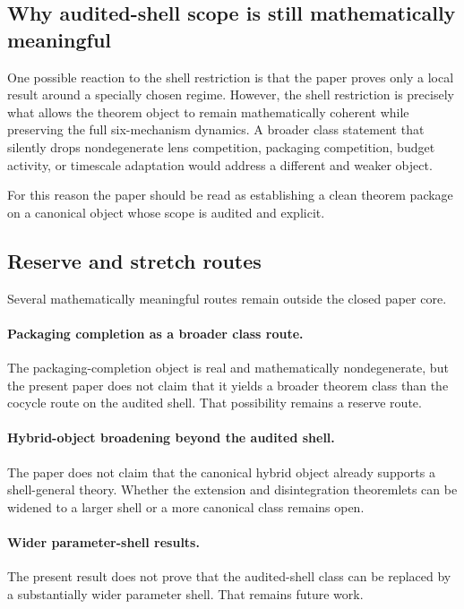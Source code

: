 \documentclass[11pt]{article}
\theoremstyle{definition}
\begin{document}
\subsection{Why audited-shell scope is still mathematically meaningful}

One possible reaction to the shell restriction is that the paper proves only a local result around a specially chosen regime. However, the shell restriction is precisely what allows the theorem object to remain mathematically coherent while preserving the full six-mechanism dynamics. A broader class statement that silently drops nondegenerate lens competition, packaging competition, budget activity, or timescale adaptation would address a different and weaker object.

For this reason the paper should be read as establishing a clean theorem package on a canonical object whose scope is audited and explicit.

\subsection{Reserve and stretch routes}

Several mathematically meaningful routes remain outside the closed paper core.

\paragraph{Packaging completion as a broader class route.}
The packaging-completion object is real and mathematically nondegenerate, but the present paper does not claim that it yields a broader theorem class than the cocycle route on the audited shell. That possibility remains a reserve route.

\paragraph{Hybrid-object broadening beyond the audited shell.}
The paper does not claim that the canonical hybrid object already supports a shell-general theory. Whether the extension and disintegration theoremlets can be widened to a larger shell or a more canonical class remains open.

\paragraph{Wider parameter-shell results.}
The present result does not prove that the audited-shell class can be replaced by a substantially wider parameter shell. That remains future work.
\end{document}
